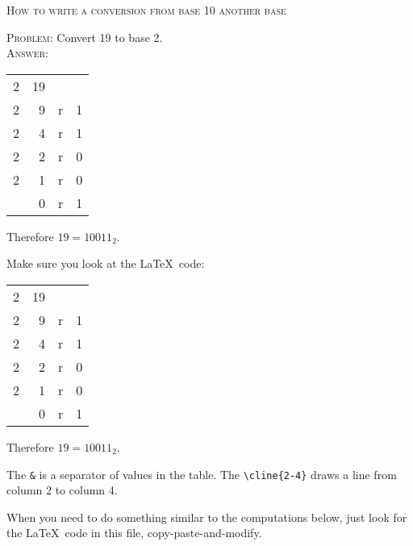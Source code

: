 \textsc{How to write a conversion from base 10 another base}

\textsc{Problem:}
Convert 19 to base 2.
\\
\textsc{Answer:}\vspace{-2mm}
\begin{answerlong}
\begin{longtable}{r|rrr}
  2 & 19 &   &   \\ \cline{2-4}
  2 &  9 & r & 1 \\ \cline{2-4}
  2 &  4 & r & 1 \\ \cline{2-4}
  2 &  2 & r & 0 \\ \cline{2-4}
  2 &  1 & r & 0 \\ \cline{2-4}
    &  0 & r & 1 \\ \cline{2-4}
\end{longtable}
Therefore $19 = 10011_{2}$.
\end{answerlong}

Make sure you look at the \LaTeX\ code:
\begin{console}[fontsize=\footnotesize]
\begin{longtable}{r|rrr}
  2 & 19 &   &   \\ \cline{2-4}
  2 &  9 & r & 1 \\ \cline{2-4}
  2 &  4 & r & 1 \\ \cline{2-4}
  2 &  2 & r & 0 \\ \cline{2-4}
  2 &  1 & r & 0 \\ \cline{2-4}
    &  0 & r & 1 \\ \cline{2-4}
\end{longtable}
Therefore $19 = 10011_{2}$.
\end{console}
The \verb!&! is a separator of values in the table.
The \verb!\cline{2-4}! draws a line from column 2 to column 4.

When you need to do something similar to the computations below,
just look for the \LaTeX\ code in this file, copy-paste-and-modify.

